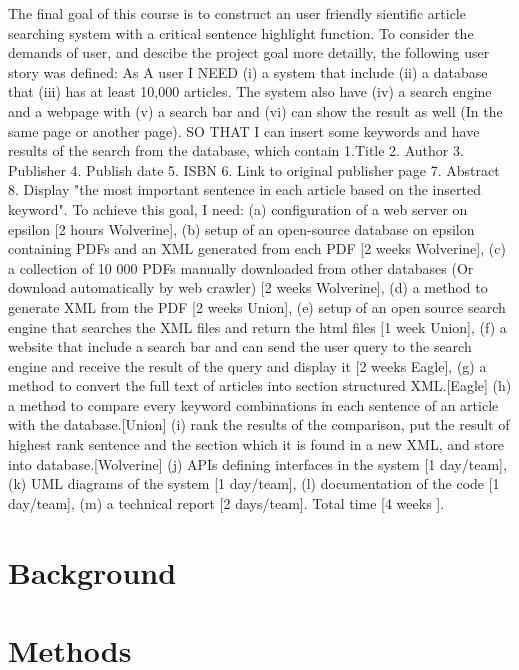 \documentclass[a4paper,twocolumn,twoside]{article}
\begin{document}
	The final goal of this course is to construct an user friendly sientific article searching system with a critical sentence highlight function. To consider the demands of user, and descibe the project goal more detailly, the following user story was defined:  
	As A user I NEED (i) a system that include (ii) a database that (iii) has at least 10,000 articles. The system also have (iv) a search engine and a webpage with (v) a search bar and (vi) can show the result as well (In the same page or another page). SO THAT I can insert some keywords and have results of the search from the database, which contain 1.Title 2. Author 3. Publisher 4. Publish date 5. ISBN 6. Link to original publisher page 7. Abstract 8. Display "the most important sentence in each article based on the inserted keyword". To achieve this goal, I need: (a) configuration of a web server on epsilon [2 hours Wolverine], (b) setup of an open-source database on epsilon containing PDFs and an XML generated from each PDF [2 weeks Wolverine], (c) a collection of 10 000 PDFs manually downloaded from other databases (Or download automatically by web crawler) [2 weeks Wolverine], (d) a method to generate XML from the PDF [2 weeks Union], (e) setup of an open source search engine that searches the XML files and return the html files [1 week Union], (f) a website that include a search bar and can send the user query to the search engine and receive the result of the query and display it [2 weeks Eagle], (g) a method to convert the full text of articles into section structured XML.[Eagle] (h) a method to compare every keyword combinations in each sentence of an article with the database.[Union] (i) rank the results of the comparison, put the result of highest rank sentence and the section which it is found in a new XML, and store into database.[Wolverine] (j) APIs defining interfaces in the system [1 day/team], (k) UML diagrams of the system [1 day/team], (l) documentation of the code [1 day/team], (m) a technical report [2 days/team]. Total time [4 weeks ].
		
	\section{Background}
	\label{Background}

	
	
	

	\section{Methods}
	\label{Methods}
	
\end{document}

